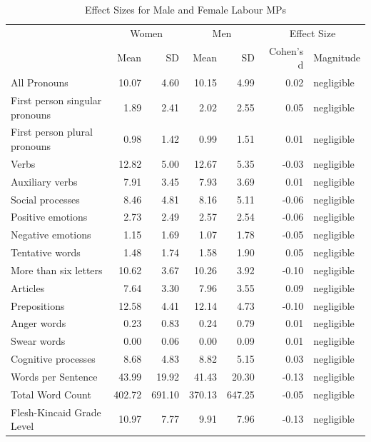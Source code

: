 \documentclass[]{article}
\theoremstyle{definition}
\theoremstyle{definition}
\theoremstyle{definition}
\theoremstyle{remark}
\begin{document}
\begin{table}[H]

\caption{\label{tab:gender-effect-sizes-table}Effect Sizes for Male and Female Labour MPs}
\centering
\begin{tabular}[t]{lrrrrrl}
\toprule
\multicolumn{1}{c}{ } & \multicolumn{2}{c}{Women} & \multicolumn{2}{c}{Men} & \multicolumn{2}{c}{Effect Size} \\
\cmidrule(l{2pt}r{2pt}){2-3} \cmidrule(l{2pt}r{2pt}){4-5} \cmidrule(l{2pt}r{2pt}){6-7}
 & Mean & SD & Mean & SD & Cohen's d & Magnitude\\
\midrule
All Pronouns & 10.07 & 4.60 & 10.15 & 4.99 & 0.02 & negligible\\
First person singular pronouns & 1.89 & 2.41 & 2.02 & 2.55 & 0.05 & negligible\\
First person plural pronouns & 0.98 & 1.42 & 0.99 & 1.51 & 0.01 & negligible\\
Verbs & 12.82 & 5.00 & 12.67 & 5.35 & -0.03 & negligible\\
Auxiliary verbs & 7.91 & 3.45 & 7.93 & 3.69 & 0.01 & negligible\\
\addlinespace
Social processes & 8.46 & 4.81 & 8.16 & 5.11 & -0.06 & negligible\\
Positive emotions & 2.73 & 2.49 & 2.57 & 2.54 & -0.06 & negligible\\
Negative emotions & 1.15 & 1.69 & 1.07 & 1.78 & -0.05 & negligible\\
Tentative words & 1.48 & 1.74 & 1.58 & 1.90 & 0.05 & negligible\\
More than six letters & 10.62 & 3.67 & 10.26 & 3.92 & -0.10 & negligible\\
\addlinespace
Articles & 7.64 & 3.30 & 7.96 & 3.55 & 0.09 & negligible\\
Prepositions & 12.58 & 4.41 & 12.14 & 4.73 & -0.10 & negligible\\
Anger words & 0.23 & 0.83 & 0.24 & 0.79 & 0.01 & negligible\\
Swear words & 0.00 & 0.06 & 0.00 & 0.09 & 0.01 & negligible\\
Cognitive processes & 8.68 & 4.83 & 8.82 & 5.15 & 0.03 & negligible\\
\addlinespace
Words per Sentence & 43.99 & 19.92 & 41.43 & 20.30 & -0.13 & negligible\\
Total Word Count & 402.72 & 691.10 & 370.13 & 647.25 & -0.05 & negligible\\
Flesh-Kincaid Grade Level & 10.97 & 7.77 & 9.91 & 7.96 & -0.13 & negligible\\
\bottomrule
\end{tabular}
\end{table}
\end{document}
